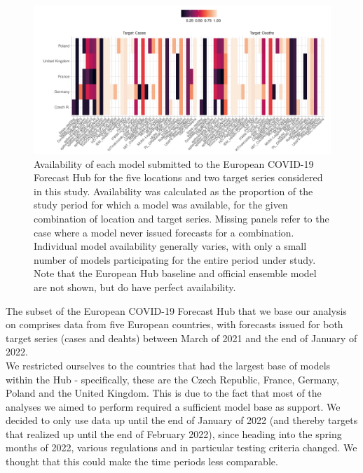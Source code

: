 \begin{figure}
\includegraphics[width = \textwidth]{../plots/availability_indiv.pdf}
\caption{Availability of each model submitted to the European COVID-19 Forecast Hub for the five locations and two target series considered in this study. Availability was calculated as the proportion of the study period for which a model was available, for the given combination of location and target series. Missing panels refer to the case where a model never issued forecasts for a combination. Individual model availability generally varies, with only a small number of models participating for the entire period under study. Note that the European Hub baseline and official ensemble model are not shown, but do have perfect availability.}
\label{fig:avail_indiv}
\end{figure}
The subset of the European COVID-19 Forecast Hub that we base our analysis on comprises data from five European countries, with forecasts issued for both target series (cases and deahts) between March of 2021 and the end of January of 2022. \\
We restricted ourselves to the countries that had the largest base of models within the Hub - specifically, these are the Czech Republic, France, Germany, Poland and the United Kingdom. This is due to the fact that most of the analyses we aimed to perform required a sufficient model base as support. We decided to only use data up until the end of January of 2022 (and thereby targets that realized up until the end of February 2022), since heading into the spring months of 2022, various regulations and in particular testing criteria changed. We thought that this could make the time periods less comparable.\\
